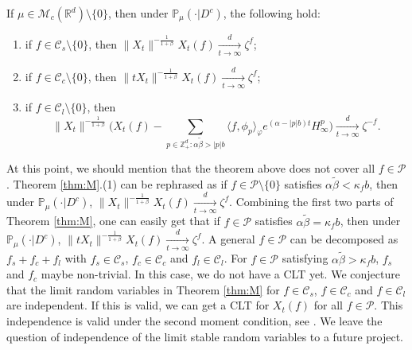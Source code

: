 \documentclass[EJP]{ejpecp} %
\begin{document}
\begin{theorem}
  \label{thm:M}
 If $\mu\in \mathcal M_c(\mathbb R^d)\setminus \{0\}$, then under $\mathbb{P}_{\mu}(\cdot|D^c)$, the following hold:
\begin{enumerate}
\item
  \label{thm:M:1}
  if $f\in \mathcal C_s\setminus\{0\}$, then $\|X_t\|^{- \frac{1}{1+\beta}} X_t(f)  \xrightarrow[t\to \infty]{d} \zeta^f$;
\item
  \label{thm:M:2}
  if $f\in \mathcal C_c\setminus\{0\}$, then $ \|t X_t\|^{-\frac{1}{1+\beta}} X_t(f) \xrightarrow[t\to \infty]{d} \zeta^f$;
\item
  \label{thm:M:3}
  if $f\in \mathcal C_l\setminus\{0\}$, then
  \[
    \|X_t\|^{-\frac{1}{1+\beta}} \Big( X_t(f) - \sum_{p\in \mathbb Z^d_+:\alpha \tilde \beta>|p|b}\langle f,\phi_p\rangle_\varphi e^{(\alpha-|p|b)t}H^p_{\infty}\Big)
    \xrightarrow[t\to \infty]{d}
    \zeta^{-f}.
  \]
\end{enumerate}
\end{theorem}


At this point, we should mention that the theorem above does not cover all $f\in \mathcal P$.
Theorem \ref{thm:M}.(1) can be rephrased as if $f\in \mathcal P\setminus\{0\}$ satisfies   $\alpha \tilde \beta < \kappa_f b$, then  under $\mathbb{P}_{\mu}(\cdot|D^c)$, $\|X_t\|^{- \frac{1}{1+\beta}} X_t(f)  \xrightarrow[t\to \infty]{d} \zeta^f$.
Combining the first two parts of Theorem \ref{thm:M}, one can easily get that  if $f\in \mathcal P$ satisfies   $\alpha \tilde \beta = \kappa_f b$, then  under $\mathbb{P}_{\mu}(\cdot|D^c)$,
$ \|t X_t\|^{-\frac{1}{1+\beta}} X_t(f) \xrightarrow[t\to \infty]{d} \zeta^f$.
A general  $f \in \mathcal P$ can be decomposed as $f_s + f_c + f_l$ with $f_s \in \mathcal C_s$, $f_c \in \mathcal C_c$ and $f_l \in \mathcal C_l$. 
For $f\in  \mathcal P$ satisfying $\alpha \tilde \beta > \kappa_f b$, $f_s$ and $f_c$ maybe non-trivial.
In this case, we do not have a CLT yet.
We conjecture that the limit random variables in Theorem \ref{thm:M} for $ f\in \mathcal C_s$, $f\in \mathcal C_c$ and $ f\in \mathcal C_l$ are independent. If this is valid, we can
get a CLT for $ X_t(f)$ for all $f\in  \mathcal P$.
This independence is valid  under the second moment condition, see \cite{RenSongZhang2015Central}.
We leave the question of independence of the limit stable random variables to a future project.
\end{document}
